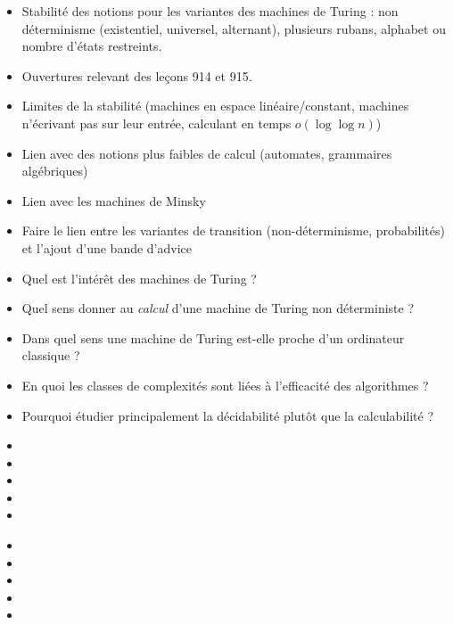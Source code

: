 \documentclass{agregfiche}
\begin{document}
\secidees

\begin{itemize}
    \item Stabilité des notions pour les variantes des machines de Turing : non
        déterminisme (existentiel, universel, alternant), 
        plusieurs rubans, alphabet ou nombre d'états restreints.
    \item Ouvertures relevant des leçons 914 et 915.
    \item Limites de la stabilité (machines en espace linéaire/constant, 
        machines n'écrivant pas sur leur entrée,
        calculant en temps $o(\log \log n)$)
    \item Lien avec des notions plus faibles de calcul (automates, grammaires
        algébriques)
    \item Lien avec les machines de Minsky
    \item Faire le lien entre les variantes de transition (non-déterminisme,
        probabilités) et l'ajout d'une bande d'advice
\end{itemize}

\secquestionsclassiques

\begin{itemize}
    \item Quel est l'intérêt des machines de Turing ?
    \item Quel sens donner au \emph{calcul} d'une machine de Turing non
        déterministe ?
    \item Dans quel sens une machine de Turing est-elle proche d'un ordinateur
        classique ?
    \item En quoi les classes de complexités sont liées à l'efficacité des
        algorithmes ?
    \item Pourquoi étudier principalement la décidabilité plutôt que la
        calculabilité ?
\end{itemize}

\secreferences

\begin{itemize}
    \item 
    \item {}
    \item {}
    \item {}
    \item {}
\end{itemize}


\secdev

\begin{itemize}
    \item {}
    \item {}
    \item {}
    \item {}
    \item {}
\end{itemize}
\end{document}
